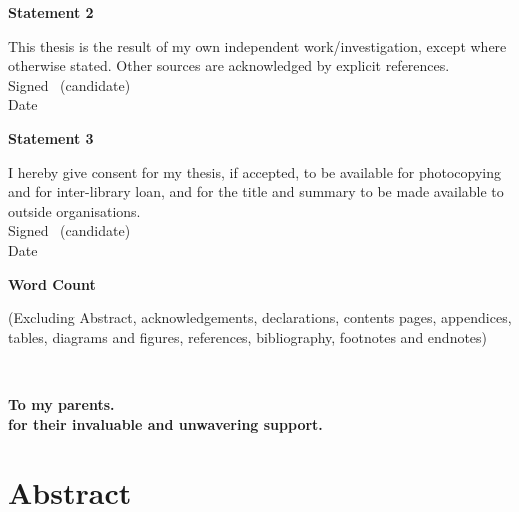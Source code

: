 \documentclass[a4paper,oneside,onecolumn,openright,12pt]{book}
\begin{document}
\textbf{\large Statement 2}

This thesis is the result of my own independent work/investigation,
except where otherwise stated. Other sources are acknowledged by
explicit references.\\[2ex]
Signed \dotfill \ (candidate) \hspace*{10em}\\[1ex]
Date\ \ \ \ \ \dotfill \hspace*{18em}

\vfill

\textbf{\large Statement 3}

I hereby give consent for my thesis, if accepted, to be available for photocopying and for inter-library loan,
 and for the title and summary to be made available to outside organisations.\\[2ex]
Signed \dotfill \ (candidate) \hspace*{10em}\\[1ex]
Date\ \ \ \ \ \dotfill \hspace*{18em}

\vfill

\vspace*{3ex}

\textbf{\large Word Count}  \ \ \ \ \dotfill \hspace*{18em}

(Excluding Abstract, acknowledgements, declarations, contents pages, appendices, tables,
diagrams and figures, references, bibliography, footnotes and endnotes)



\ \vspace*{1.11cm}
\begin{flushright}
\textbf{\large To my parents.}\\
\textbf{\large for their invaluable and unwavering support.}
\end{flushright}
\newpage
\markboth{}{}
\cleardoublepage


\chapter*{Abstract}


\end{document}
